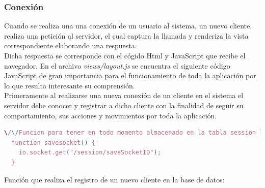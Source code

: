 \subsubsection{ Conexión }
\label{sec:conexion}


Cuando se realiza una una conexión de un usuario al sistema, un nuevo cliente, realiza una petición al servidor, el cual captura la llamada y renderiza la vista correspondiente elaborando una respuesta.\\

Dicha respuesta se corresponde con el cógido Html y JavaScript que recibe el navegador. En el archivo \emph{views/layout.js} se encuentra el siguiente código JavaScript de gran importancia
para el funcionamiento de toda la aplicación por lo que resulta interesante su comprensión.\\

Primeramente al realizarse una nueva conexión de un cliente en el sistema el servidor debe conocer y registrar a dicho cliente con la finalidad de seguir su comportamiento, sus acciones y 
movimientos por toda la aplicación.\\

\begin{lstlisting}[language=JavaScript]
  \/\/Funcion para tener en todo momento almacenado en la tabla session los sockets conectados junto con el usuario al que pertenece
  function savesocket() {
    io.socket.get("/session/saveSocketID");
  }  
\end{lstlisting}


Función que realiza el registro de un nuevo cliente en la base de datos:\\

